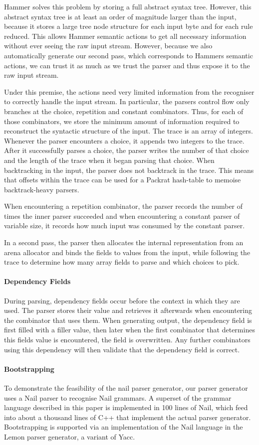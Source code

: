 Hammer solves this problem by storing a full abstract syntax tree. However, this
abstract syntax tree is at least an order of magnitude larger than the input,
because it stores a large tree node structure for each input byte and for each
rule reduced. This allows Hammer semantic actions to get all necessary
information without ever seeing the raw input stream. However, because we also
automatically generate our second pass, which corresponds to Hammers semantic
actions, we can trust it as much as we trust the parser and thus expose it to
the raw input stream.

Under this premise, the actions need very limited information from the
recogniser to correctly handle the input stream. In particular, the parsers
control flow only branches at the choice, repetition and constant
combinators.
Thus, for each of those combinators, we store the minimum amount of information
required to reconstruct the syntactic structure of the input. The trace is an
array of integers.
 Whenever the parser encounters a choice, it appends two integers to the trace. After it
successfully parses a choice, the parser writes the number of that choice and
the length of the trace when it began parsing that choice. When backtracking in
the input, the parser does not backtrack in the trace. This means that offsets
within the trace can be used for a Packrat hash-table to memoise backtrack-heavy
parsers.

When encountering a repetition combinator, the parser records the number of
times the inner parser succeeded and when encountering a constant parser of
variable size, it records how much input was consumed by the constant parser. 

In a second pass, the parser then allocates the internal representation from an
arena allocator and binds the fields to values from the input, while following
the trace to determine how many array fields to parse and which choices to pick.
\paragraph{Dependency Fields}
During parsing, dependency fields occur before the context in which they are
used. The parser stores their value and retrieves it afterwards when
encountering the combinator that uses them. When generating output, the
dependency field is first filled with a filler value, then later when the first
combinator that determines this fields value is encountered, the field is
overwritten. Any further combinators using this dependency will then validate
that the dependency field is correct.
\paragraph{Bootstrapping}
To demonstrate the feasibility of the nail parser generator, our parser
generator uses a Nail parser to recognise Nail grammars. A superset of the
grammar language described in this paper is implemented in 100 lines of Nail,
which feed into about a thousand lines of C++ that implement the actual parser
generator. Bootstrapping is supported via an implementation of the Nail language
in the Lemon parser generator, a variant of Yacc.
